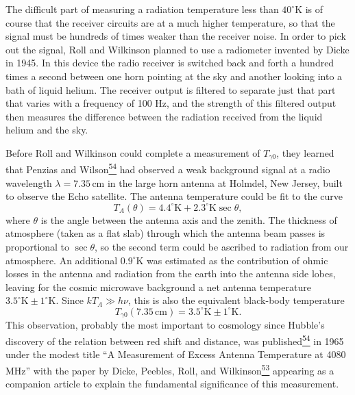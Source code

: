 The difficult part of measuring a radiation temperature less than
\(40^\circ\mathrm{K}\) is of course that the receiver circuits are at a much
higher temperature, so that the signal must be hundreds of times weaker than
the receiver noise. In order to pick out the signal, Roll and Wilkinson planned
to use a radiometer invented by Dicke in 1945. In this device the radio
receiver is switched back and forth a hundred times a second between one horn
pointing at the sky and another looking into a bath of liquid helium. The
receiver output is filtered to separate just that part that varies with a
frequency of 100 Hz, and the strength of this filtered output then measures the
difference between the radiation received from the liquid helium and the sky.

Before Roll and Wilkinson could complete a measurement of \(T_{\gamma0}\),
they learned that Penzias and
Wilson\hyperref[ch15-ref-54]{\textsuperscript{54}} had observed a weak
background signal at a radio wavelength \(\lambda=7.35\,\mathrm{cm}\) in the
large horn antenna at Holmdel, New Jersey, built to observe the Echo satellite.
The antenna temperature could be fit to the curve
\[
  T_A(\theta)=4.4^\circ\mathrm{K}
  +2.3^\circ\mathrm{K}\sec\theta,
\]
where \(\theta\) is the angle between the antenna axis and the zenith. The
thickness of atmosphere (taken as a flat slab) through which the antenna beam
passes is proportional to \(\sec\theta\), so the second term could be ascribed
to radiation from our atmosphere. An additional \(0.9^\circ\mathrm{K}\) was
estimated as the contribution of ohmic losses in the antenna and radiation
from the earth into the antenna side lobes, leaving for the cosmic microwave
background a net antenna temperature \(3.5^\circ\mathrm{K}\pm1^\circ
\mathrm{K}\). Since \(kT_A\gg h\nu\), this is also the equivalent black-body
temperature
\[
  T_{\gamma0}(7.35\,\mathrm{cm})
  =
  3.5^\circ\mathrm{K}\pm1^\circ\mathrm{K}.
\]
This observation, probably the most important to cosmology since Hubble's
discovery of the relation between red shift and distance, was
published\hyperref[ch15-ref-54]{\textsuperscript{54}} in 1965 under the
modest title ``A Measurement of Excess Antenna Temperature at 4080 MHz'' with
the paper by Dicke, Peebles, Roll, and
Wilkinson\hyperref[ch15-ref-53]{\textsuperscript{53}} appearing as a companion
article to explain the fundamental significance of this measurement.

